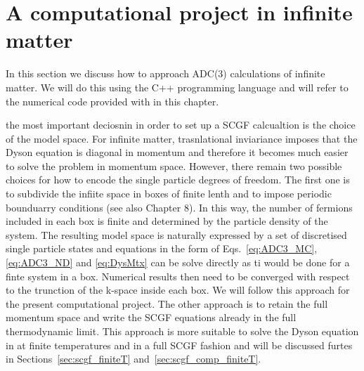 \section{A computational project in infinite matter}
\label{sec:scgf_comp}


In this section we discuss how to approach  ADC(3) calculations of infinite matter. We will do this 
using the C++ programming language and will refer to the numerical code provided with in this chapter.

the most important deciosnin in order to set up a SCGF calcualtion is the choice of the model space. For
infinite matter, trasnlational inviariance imposes that the Dyson equation is diagonal in momentum  and 
therefore it becomes much easier to solve the problem in momentum space. However, there remain two possible
choices for how to encode the single particle degrees of freedom. 
The first one is to subdivide the infiite space in  boxes of finite lenth  and to impose periodic bounduarry conditions
(see also Chapter 8). In this way, the number of fermions included in each box is finite and determined by the particle
density of the system. The resulting model space is naturally expressed by a set of discretised single particle 
states and equations in the form of Eqs.~\eqref{eq:ADC3_MC}, \eqref{eq:ADC3_ND} and \eqref{eq:DysMtx}
can be solve directly as ti would be done for a finte system in a box.  Numerical results then need to be converged 
with respect to the trunction of the k-space inside each box.   We will follow this approach for the present 
computational project.
The other approach is to retain the full momentum space and write the SCGF equations already in the full 
thermodynamic limit. This approach is more suitable to solve the Dyson equation in at finite temperatures and
in a full SCGF fashion and will be discussed furtes in Sections~\ref{sec:scgf_finiteT} and~\ref{sec:scgf_comp_finiteT}.


